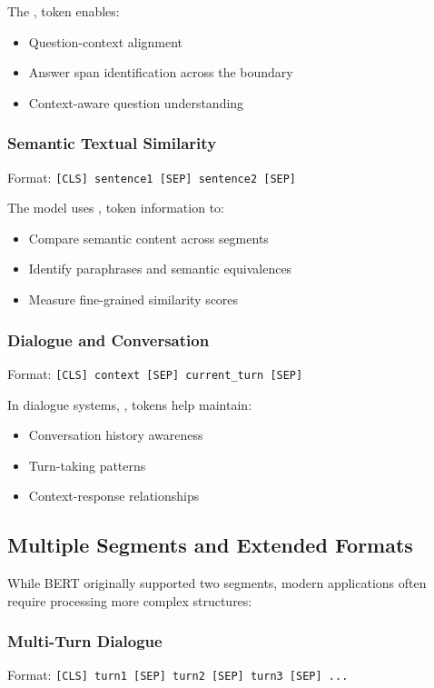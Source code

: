 The \sep{} token enables:
\begin{itemize}
\item Question-context alignment
\item Answer span identification across the boundary
\item Context-aware question understanding
\end{itemize}

\subsubsection{Semantic Textual Similarity}
Format: \texttt{[CLS] sentence1 [SEP] sentence2 [SEP]}

The model uses \sep{} token information to:
\begin{itemize}
\item Compare semantic content across segments
\item Identify paraphrases and semantic equivalences
\item Measure fine-grained similarity scores
\end{itemize}

\subsubsection{Dialogue and Conversation}
Format: \texttt{[CLS] context [SEP] current\_turn [SEP]}

In dialogue systems, \sep{} tokens help maintain:
\begin{itemize}
\item Conversation history awareness
\item Turn-taking patterns
\item Context-response relationships
\end{itemize}

\subsection{Multiple Segments and Extended Formats}

While BERT originally supported two segments, modern applications often require processing more complex structures:

\subsubsection{Multi-Turn Dialogue}
Format: \texttt{[CLS] turn1 [SEP] turn2 [SEP] turn3 [SEP] ...}

